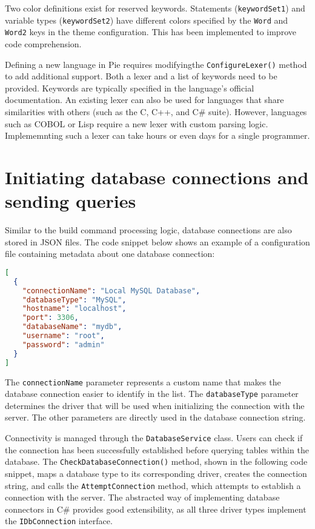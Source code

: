 Two color definitions exist for reserved keywords. Statements (\texttt{keywordSet1}) and variable types (\texttt{keywordSet2}) have different colors specified by the \texttt{Word} and \texttt{Word2} keys in the theme configuration. This has been implemented to improve code comprehension.

Defining a new language in Pie requires modifyingthe \texttt{ConfigureLexer()} method to add additional support. Both a lexer and a list of keywords need to be provided. Keywords are typically specified in the language's official documentation. An existing lexer can also be used for languages that share similarities with others (such as the C, C++, and C\# suite). However, languages such as COBOL or Lisp require a new lexer with custom parsing logic. Implememnting such a lexer can take hours or even days for a single programmer.

\section{Initiating database connections and sending queries}

Similar to the build command processing logic, database connections are also stored in JSON files. The code snippet below shows an example of a configuration file containing metadata about one database connection:

\begin{lstlisting}[language=json, caption={Structure of the JSON-formatted database connections file in Pie}]
[
  {
    "connectionName": "Local MySQL Database",
    "databaseType": "MySQL",
    "hostname": "localhost",
    "port": 3306,
    "databaseName": "mydb",
    "username": "root",
    "password": "admin"
  }
]
\end{lstlisting}

The \texttt{connectionName} parameter represents a custom name that makes the database connection easier to identify in the list. The \texttt{databaseType} parameter determines the driver that will be used when initializing the connection with the server. The other parameters are directly used in the database connection string.

Connectivity is managed through the \texttt{DatabaseService} class. Users can check if the connection has been successfully established before querying tables within the database. The \texttt{CheckDatabaseConnection()} method, shown in the following code snippet, maps a database type to its corresponding driver, creates the connection string, and calls the \texttt{AttemptConnection} method, which attempts to establish a connection with the server. The abstracted way of implementing database connectors in C\# provides good extensibility, as all three driver types implement the \texttt{IDbConnection} interface.

